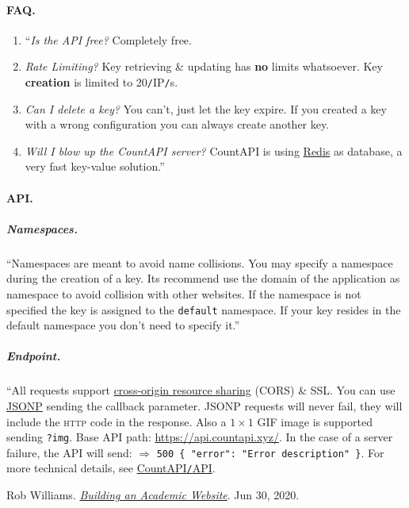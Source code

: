 \documentclass{article}
\numberwithin{equation}{section}
\begin{document}
\paragraph{FAQ.}
\begin{enumerate}
	\item ``\textit{Is the API free?} Completely free.
	\item \textit{Rate Limiting?} Key retrieving \& updating has \textbf{no} limits whatsoever. Key \textbf{creation} is limited to 20\texttt{/}IP\texttt{/}s.
	\item \textit{Can I delete a key?} You can't, just let the key expire. If you created a key with a wrong configuration you can always create another key.
	\item \textit{Will I blow up the CountAPI server?} CountAPI is using \href{https://redis.io/}{Redis} as database, a very fast key-value solution.''
\end{enumerate}

\paragraph{API.}

\subparagraph{Namespaces.} ``Namespaces are meant to avoid name collisions. You may specify a namespace during the creation of a key. Its recommend use the domain of the application as namespace to avoid collision with other websites. If the namespace is not specified the key is assigned to the \texttt{default} namespace. If your key resides in the default namespace you don't need to specify it.''

\subparagraph{Endpoint.} ``All requests support \href{https://developer.mozilla.org/en-US/docs/Web/HTTP/CORS}{cross-origin resource sharing} (CORS) \& SSL. You can use \href{https://en.wikipedia.org/wiki/JSONP}{JSONP} sending the callback parameter. JSONP requests will never fail, they will include the \textsc{http} code in the response. Also a $1\times 1$ GIF image is supported sending \texttt{?img}. Base API path: \url{https://api.countapi.xyz/}. In the case of a server failure, the API will send: $\Rightarrow$ \verb|500 { "error": "Error description" }|. For more technical details, see \href{https://countapi.xyz/#api}{CountAPI\texttt{/}API}.


\begin{thebibliography}{99}
	 Rob Williams. \href{https://jayrobwilliams.com/posts/2020/06/academic-website/}{\textit{Building an Academic Website}}. Jun 30, 2020.
\end{thebibliography}


\printbibliography[heading=bibintoc]
	
\end{document}
